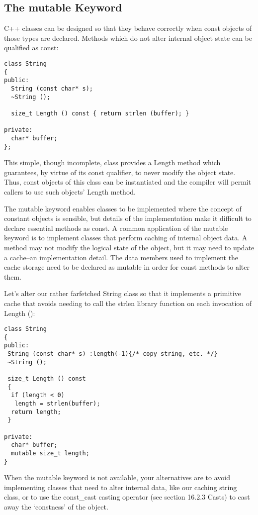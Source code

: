 \subsection{The mutable Keyword}

C++ classes can be designed so that they behave correctly when const objects of those types are declared. Methods which do not alter internal object state can be qualified as const: 

\begin{Verbatim}[frame=single]
class String
{
public:
  String (const char* s);
  ~String ();

  size_t Length () const { return strlen (buffer); }

private:
  char* buffer;
};
\end{Verbatim}

This simple, though incomplete, class provides a Length method which guarantees, by virtue of its const qualifier, to never modify the object state. Thus, const objects of this class can be instantiated and the compiler will permit callers to use such objects' Length method.

The mutable keyword enables classes to be implemented where the concept of constant objects is sensible, but details of the implementation make it difficult to declare essential methods as const. A common application of the mutable keyword is to implement classes that perform caching of internal object data. A method may not modify the logical state of the object, but it may need to update a cache--an implementation detail. The data members used to implement the cache storage need to be declared as mutable in order for const methods to alter them.

Let's alter our rather farfetched String class so that it implements a primitive cache that avoids needing to call the strlen library function on each invocation of Length (): 

\begin{Verbatim}[frame=single]
class String
{
public:
 String (const char* s) :length(-1){/* copy string, etc. */}
 ~String ();

 size_t Length () const
 {
  if (length < 0)
   length = strlen(buffer);
  return length;
 }

private:
  char* buffer;
  mutable size_t length;
}
\end{Verbatim}

When the mutable keyword is not available, your alternatives are to avoid implementing classes that need to alter internal data, like our caching string class, or to use the const\_{}cast casting operator (see section 16.2.3 Casts) to cast away the `constness' of the object. 

